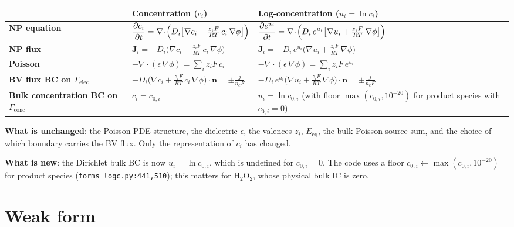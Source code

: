 \documentclass[11pt]{article}
\newcommand{\Gelec}{\Gamma_{\mathrm{elec}}}
\newcommand{\Gconc}{\Gamma_{\mathrm{conc}}}
\begin{document}
\begin{center}
\renewcommand{\arraystretch}{1.6}
\begin{tabular}{@{} >{\bfseries}p{} p{} p{} @{}}
\toprule
& \textbf{Concentration ($c_i$)} & \textbf{Log-concentration ($u_i = \ln c_i$)} \\
\midrule
NP equation &
$\displaystyle \frac{\partial c_i}{\partial t}
   = \nabla\!\cdot\!\Bigl(D_i\bigl[\nabla c_i
       + \tfrac{z_i F}{RT}\,c_i\,\nabla\phi\bigr]\Bigr)$ &
$\displaystyle \frac{\partial e^{u_i}}{\partial t}
   = \nabla\!\cdot\!\Bigl(D_i\,e^{u_i}\bigl[\nabla u_i
       + \tfrac{z_i F}{RT}\,\nabla\phi\bigr]\Bigr)$ \\
NP flux &
$\mathbf J_i = -D_i\bigl(\nabla c_i + \tfrac{z_i F}{RT}\,c_i\,\nabla\phi\bigr)$ &
$\mathbf J_i = -D_i\,e^{u_i}\bigl(\nabla u_i + \tfrac{z_i F}{RT}\,\nabla\phi\bigr)$ \\
Poisson &
$-\nabla\!\cdot\!(\epsilon\,\nabla\phi) = \sum_i z_i F\,c_i$ &
$-\nabla\!\cdot\!(\epsilon\,\nabla\phi) = \sum_i z_i F\,e^{u_i}$ \\
BV flux BC on $\Gelec$ &
$-D_i\bigl(\nabla c_i + \tfrac{z_i F}{RT}\,c_i\,\nabla\phi\bigr)\cdot\mathbf n = \pm \tfrac{j}{n_e F}$ &
$-D_i\,e^{u_i}\bigl(\nabla u_i + \tfrac{z_i F}{RT}\,\nabla\phi\bigr)\cdot\mathbf n = \pm \tfrac{j}{n_e F}$ \\
Bulk concentration BC on $\Gconc$ &
$c_i = c_{0,i}$ &
$u_i = \ln c_{0,i}$ \quad (with floor $\max(c_{0,i},10^{-20})$ for product species with $c_{0,i}=0$) \\
\bottomrule
\end{tabular}
\end{center}

\noindent
\textbf{What is unchanged}: the Poisson PDE structure, the dielectric
$\epsilon$, the valences $z_i$, $E_{\mathrm{eq}}$, the bulk Poisson source
sum, and the choice of which boundary carries the BV flux. Only the
representation of $c_i$ has changed.

\textbf{What is new}: the Dirichlet bulk BC is now $u_i = \ln c_{0,i}$,
which is undefined for $c_{0,i}=0$. The code uses a floor
$c_{0,i} \leftarrow \max(c_{0,i}, 10^{-20})$ for product species
(\texttt{forms\_logc.py:441,510}); this matters for $\mathrm{H_2O_2}$,
whose physical bulk IC is zero.

\section{Weak form}
\end{document}
